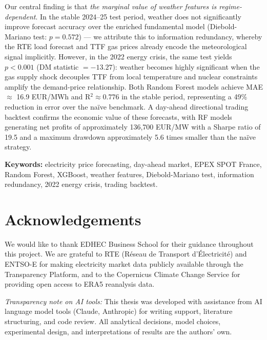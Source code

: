 \documentclass[12pt, a4paper, oneside]{report}
\begin{document}
Our central finding is that \textit{the marginal value of weather features
is regime-dependent}. In the stable 2024--25 test period, weather does not
significantly improve forecast accuracy over the enriched fundamental model
(Diebold-Mariano test: $p = 0.572$) — we attribute this to information
redundancy, whereby the RTE load forecast and TTF gas prices already encode
the meteorological signal implicitly. However, in the 2022 energy crisis, the
same test yields $p < 0.001$ (DM statistic $= -13.27$): weather becomes
highly significant when the gas supply shock decouples TTF from local
temperature and nuclear constraints amplify the demand-price relationship.
Both Random Forest models achieve MAE $\approx$ 16.9 EUR/MWh and
R$^2 \approx 0.776$ in the stable period, representing a 49\% reduction in
error over the na\"{i}ve benchmark. A day-ahead directional trading backtest
confirms the economic value of these forecasts, with RF models generating net
profits of approximately 136,700 EUR/MW with a Sharpe ratio of 19.5 and a
maximum drawdown approximately 5.6 times smaller than the na\"{i}ve strategy.

\vspace{1em}
\noindent\textbf{Keywords:} electricity price forecasting, day-ahead market,
EPEX SPOT France, Random Forest, XGBoost, weather features, Diebold-Mariano
test, information redundancy, 2022 energy crisis, trading backtest.

\chapter*{Acknowledgements}

We would like to thank EDHEC Business School for their guidance throughout this project. We are grateful to RTE (R\'{e}seau de Transport d'Électricit\'{e}) and ENTSO-E for making electricity market data publicly available through the Transparency Platform, and to the Copernicus Climate Change Service for providing open access to ERA5 reanalysis data.

\medskip
\noindent\textit{Transparency note on AI tools:} This thesis was developed with assistance from AI language model tools (Claude, Anthropic) for writing support, literature structuring, and code review. All analytical decisions, model choices, experimental design, and interpretations of results are the authors' own.

\tableofcontents
\listoffigures
\listoftables
\end{document}
